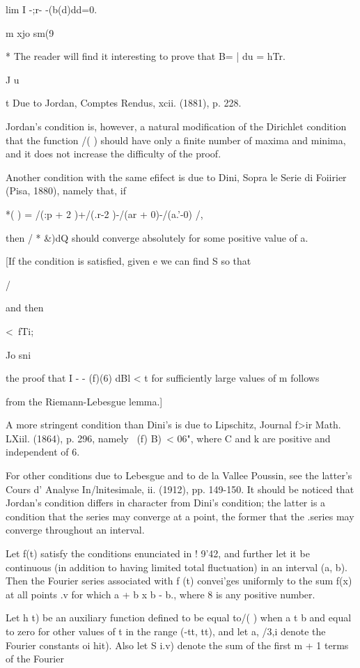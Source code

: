 lim I -;r- -(b(d)dd=0.

m xjo sm(9

* The reader will find it interesting to prove that B= | du = hTr.

J u

t Due to Jordan, Comptes Rendus, xcii. (1881), p. 228.

%
%

Jordan's condition is, however, a natural modification of the
Dirichlet condition that the function /( ) should have only a finite
number of maxima and minima, and it does not increase the difficulty
of the proof.

Another condition with the same efifect is due to Dini, Sopra le Serie
di Foiirier (Pisa, 1880), namely that, if

*( ) = /(:p + 2 )+/(.r-2 )-/(ar + 0)-/(a.'-0) /,

then / * \&)dQ should converge absolutely for some positive value of
a.

[If the condition is satisfied, given e we can find S so that

/

and then

<\ fTi;

Jo sni

the proof that I - - (f)(6) dBl < t for sufficiently large values of m
follows

from the Riemann-Lebesgue lemma.]

A more stringent condition than Dini's is due to Lipschitz, Journal
f>ir Math. LXiil. (1864), p. 296, namely \ (f) B)\ < 06", where C and
k are positive and independent of 6.

For other conditions due to Lebesgue and to de la Vallee Poussin, see
the latter's Cours d' Analyse In/lnitesimale, ii. (1912), pp. 149-150.
It should be noticed that Jordan's condition differs in character from
Dini's condition; the latter is a condition that the series may
converge at a point, the former that the .series may converge
throughout an interval.

Let f(t) satisfy the conditions enunciated in ! 9'42, and further let
it be continuous (in addition to having limited total fluctuation) in
an interval (a, b). Then the Fourier series associated with f (t)
convei'ges uniformly to the sum f(x) at all points .v for which a + b
x b - b., where 8 is any positive number.

Let h t) be an auxiliary function defined to be equal to/( ) when a t
b and equal to zero for other values of t in the range (-tt, tt), and
let a, /3,i denote the Fourier constants oi hit). Also let S i.v)
denote the sum of the first m + 1 terms of the Fourier

